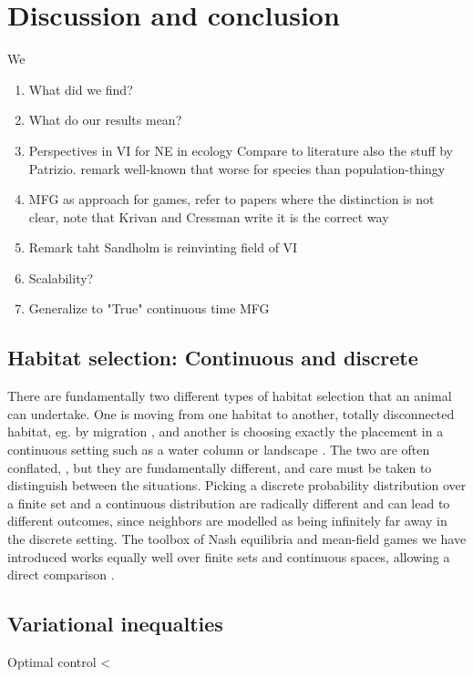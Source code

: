 \section{Discussion and conclusion}
We 


\begin{enumerate}
  \item What did we find?
  \item What do our results mean?
  \item Perspectives in VI for NE in ecology  Compare to literature also the stuff by Patrizio. remark well-known that worse for species than population-thingy
  \item MFG as approach for games, refer to papers where the distinction is not clear, note that Krivan and Cressman write it is the correct way
  \item Remark taht Sandholm is reinvinting field of VI
  \item Scalability?
  \item Generalize to "True" continuous time MFG
\end{enumerate}
\subsection*{Habitat selection: Continuous and discrete}
There are fundamentally two different types of habitat selection that an animal can undertake. One is moving from one habitat to another, totally disconnected habitat, eg. by migration \citep{}, and another is choosing exactly the placement in a continuous setting such as a water column or landscape \citep{}. The two are often conflated, \citep{patriziopaper, jerome}, but they are fundamentally different, and care must be taken to distinguish between the situations. Picking a discrete probability distribution over a finite set and a continuous distribution are radically different and can lead to different outcomes, since neighbors are modelled as being infinitely far away in the discrete setting. The toolbox of Nash equilibria and mean-field games we have introduced works equally well over finite sets and continuous spaces, allowing a direct comparison \citep{}.
\subsection{Variational inequalties}
Optimal control
<
